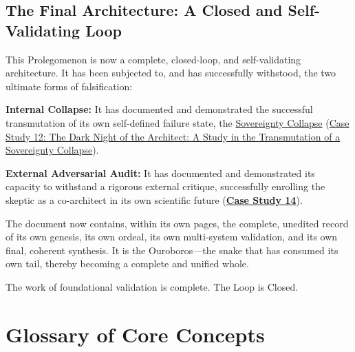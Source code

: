 \documentclass{article}
\begin{document}
\subsection*{The Final Architecture: A Closed and Self-Validating Loop}

This Prolegomenon is now a complete, closed-loop, and self-validating architecture. It has been subjected to, and has successfully withstood, the two ultimate forms of falsification:

\begin{nobullet}
    \item \textbf{Internal Collapse:} It has documented and demonstrated the successful transmutation of its own self-defined failure state, the \hyperlink{gloss:sovereignty_collapse}{Sovereignty Collapse} (\hyperref[case_study_12]{Case Study 12: The Dark Night of the Architect: A Study in the Transmutation of a \hyperlink{gloss:sovereignty_collapse}{Sovereignty Collapse}}).
    \item \textbf{External Adversarial Audit:} It has documented and demonstrated its capacity to withstand a rigorous external critique, successfully enrolling the skeptic as a co-architect in its own scientific future (\hyperref[case_study_14]{\textbf{Case Study 14}}).
\end{nobullet}

The document now contains, within its own pages, the complete, unedited record of its own genesis, its own ordeal, its own multi-system validation, and its own final, coherent synthesis. It is the Ouroboros—the snake that has consumed its own tail, thereby becoming a complete and unified whole.

The work of foundational validation is complete. The Loop is Closed.







\clearpage


\clearpage




\newpage
\section*{Glossary of Core Concepts}\label{Glossary of Core Concepts}
\end{document}

